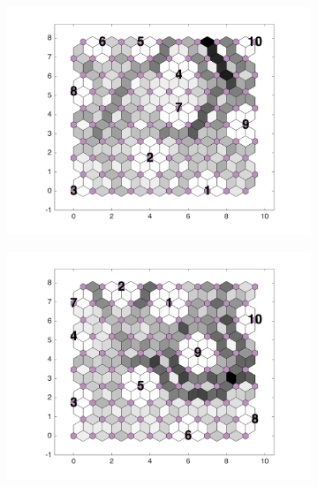 \begin{figure}
\begin{subfigure}[b]{0.3\textwidth}
        \includegraphics[width=\textwidth]{../../images0.01/M31/2D/diff_dimension/combine_2D_data_between_cols3and23.png}
        \label{fig: col3and23_dist}
    \end{subfigure}
            \hfill
    \begin{subfigure}[b]{0.3\textwidth}
        \centering
        \includegraphics[width=\textwidth]{../../images0.01/M31/2D/diff_dimension/combine_2D_data_between_cols3and24.png}
        \label{fig: col3and24_dist}
    \end{subfigure}
            \hfill
    \begin{subfigure}[b]{0.3\textwidth}
        \centering

\end{subfigure}
\end{figure}
